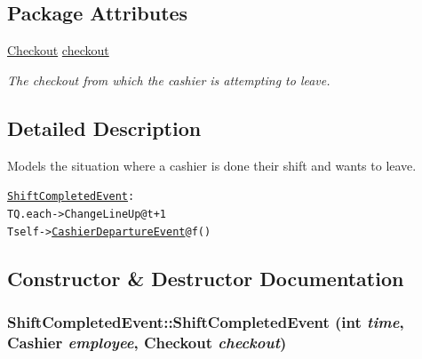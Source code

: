 \subsection*{Package Attributes}
\begin{CompactItemize}
\item 
\hypertarget{class_shift_completed_event_91532b8cba3678f6be6d7ed6bbf33660}{
\hyperlink{class_checkout}{Checkout} \hyperlink{class_shift_completed_event_91532b8cba3678f6be6d7ed6bbf33660}{checkout}}
\label{class_shift_completed_event_91532b8cba3678f6be6d7ed6bbf33660}

\begin{CompactList}\small\item\em The checkout from which the cashier is attempting to leave. \item\end{CompactList}\end{CompactItemize}


\subsection{Detailed Description}
Models the situation where a cashier is done their shift and wants to leave. 

\small\begin{alltt}
 \hyperlink{class_shift_completed_event}{ShiftCompletedEvent}:
   T Q.each -> ChangeLineUp @ t+1
   T self -> \hyperlink{class_cashier_departure_event}{CashierDepartureEvent} @ f()
 \end{alltt}
\normalsize 
 

\subsection{Constructor \& Destructor Documentation}
\hypertarget{class_shift_completed_event_12cfabd48a4b30fa4baa2b2b1d6ca718}{
\subsubsection[{ShiftCompletedEvent}]{\setlength{\rightskip}{0pt plus 5cm}ShiftCompletedEvent::ShiftCompletedEvent (int {\em time}, \/  {\bf Cashier} {\em employee}, \/  {\bf Checkout} {\em checkout})}}
\label{class_shift_completed_event_12cfabd48a4b30fa4baa2b2b1d6ca718}


